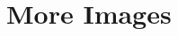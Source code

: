 \documentclass[10pt]{scrartcl}
\begin{document}

\newpage

\section{More Images}    
\end{document}
